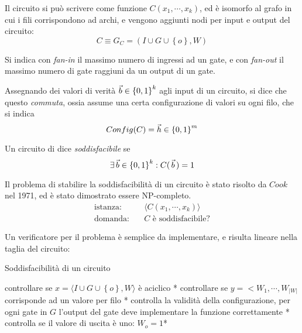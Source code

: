 
Il circuito si può scrivere come funzione $C \left( x_1, \cdots, x_k \right)$, ed è isomorfo al grafo in cui i fili corrispondono ad archi, e vengono aggiunti nodi per input e output del circuito:
\begin{equation*}
    C \equiv G_C = \left( I \cup G \cup \left\{ o \right\}, W \right)
\end{equation*}


Si indica con \emph{fan-in} il massimo numero di ingressi ad un gate, e con \emph{fan-out} il massimo numero di gate raggiuni da un output di un gate.

Assegnando dei valori di verità $\vec{b} \in \left\{0,1\right\}^{k}$ agli input di un circuito, si dice che questo \emph{commuta}, ossia assume una certa configurazione di valori su ogni filo, che si indica
\begin{equation*}
    Config(C) = \vec{h} \in \left\{0,1\right\}^{m}
\end{equation*}

Un circuito di dice \emph{soddisfacibile} se
\begin{equation*}
    \exists \,\vec{b} \in \left\{0,1\right\}^{k} : C ( \, \vec{b} \,) = 1
\end{equation*}

Il problema di stabilire la soddisfacibilità di un circuito è stato risolto da $Cook$ nel 1971, ed è stato dimostrato essere NP-completo.
\begin{align*}
    \text{istanza:} \quad & \langle  C \left( x_1, \cdots, x_k \right)  \rangle \\
    \text{domanda:} \quad & C \text{ è soddisfacibile?}
\end{align*}

Un verificatore per il problema è semplice da implementare, e risulta lineare nella taglia del circuito:
\begin{algorithm}[H]
\caption{Soddisfacibilità di un circuito}\label{alg:cooksoddisfa}
\begin{algorithmic}[1]
        \State * controllare se $x = \langle  I \cup G \cup \left\{ o \right\}, W  \rangle$ è aciclico *
        \State * controllare se $y = < W_1, \cdots, W_{|W|}$ corrisponde ad un valore per filo *
        \State * controlla la validità della configurazione, per ogni gate in $G$ l'output del gate deve implementare la funzione correttamente *
        \State * controlla se il valore di uscita è uno: $W_o = 1$*
    \EndProcedure
\end{algorithmic}
\end{algorithm}

